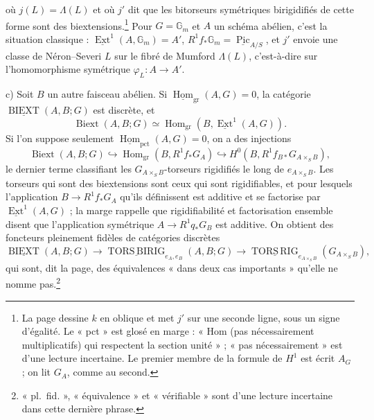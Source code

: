 \documentclass[11pt,a4paper]{article}
\begin{document}

où $j(L) = \Lambda(L)$ et où $j'$ dit que les bitorseurs symétriques
birigidifiés de cette forme sont des biextensions.\footnote{La page dessine $k$
en oblique et met $j'$ sur une seconde ligne, sous un signe d'égalité. Le
« pct » est glosé en marge : « Hom (pas nécessairement multiplicatifs) qui
respectent la section unité » ; « pas nécessairement » est d'une lecture
incertaine. Le premier membre de la formule de $H^1$ est écrit $A_G$ ; on lit
$G_A$, comme au second.} Pour $G = \mathbb{G}_m$ et $A$ un schéma abélien, c'est
la situation classique : $\underline{\operatorname{Ext}}^1(A, \mathbb{G}_m) = A'$,
$R^1f_*\mathbb{G}_m = \underline{\operatorname{Pic}}_{A/S}$, et $j'$ envoie une
classe de Néron--Severi $L$ sur le fibré de Mumford $\Lambda(L)$, c'est-à-dire sur
l'homomorphisme symétrique $\varphi_L\colon A \to A'$.

c) Soit $B$ un autre faisceau abélien. Si
$\underline{\operatorname{Hom}}_{\mathrm{gr}}(A, G) = 0$, la catégorie
$\underline{\operatorname{BIEXT}}(A, B; G)$ est discrète, et
\[ \operatorname{Biext}(A, B; G) \simeq \operatorname{Hom}_{\mathrm{gr}}(B,
\underline{\operatorname{Ext}}^1(A, G)) . \]
Si l'on suppose seulement $\underline{\operatorname{Hom}}_{\mathrm{pct}}(A, G) =
0$, on a des injections
\[ \operatorname{Biext}(A, B; G) \hookrightarrow
\operatorname{Hom}_{\mathrm{gr}}(B, R^1f_*G_A) \hookrightarrow H^0(B,
R^1f_{B*}G_{A \times_S B}) , \]
le dernier terme classifiant les $G_{A \times_S B}$-torseurs rigidifiés le long
de $e_{A \times_S B}$. Les torseurs qui sont des biextensions sont ceux qui sont
rigidifiables, et pour lesquels l'application $B \to R^1f_*G_A$ qu'ils
définissent est additive et se factorise par $\underline{\operatorname{Ext}}^1(A,
G)$ ; la marge rappelle que rigidifiabilité et factorisation ensemble disent que
l'application symétrique $A \to R^1q_*G_B$ est additive. On obtient des foncteurs
pleinement fidèles de catégories discrètes
\[ \underline{\operatorname{BIEXT}}(A, B; G) \to
\underline{\operatorname{TORS\,BIRIG}}_{e_A, e_B}(A, B; G) \to
\underline{\operatorname{TORS\,RIG}}_{e_{A \times_S B}}(G_{A \times_S B}) , \]
qui sont, dit la page, des équivalences « dans deux cas importants » qu'elle ne
nomme pas.\footnote{« pl.\ fid. », « équivalence » et « vérifiable » sont d'une
lecture incertaine dans cette dernière phrase.}
\end{document}
